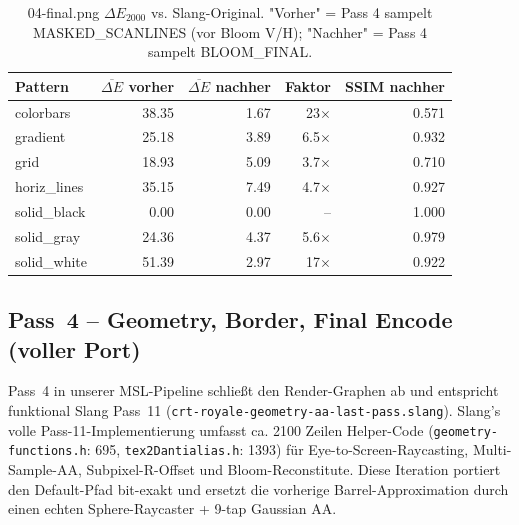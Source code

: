 \documentclass[11pt, a4paper]{article}
\newcommand{\tableheadercolor}{\rowcolor{hkared}}
\newcommand{\thw}[1]{\color{white}\textbf{#1}}  %
\begin{document}
\vspace{.25cm}
\begin{table}[H]
\centering
\small
{}
\begin{tabularx}{\textwidth}{lrrrr}
    \toprule
    \tableheadercolor \thw{Pattern} & \thw{$\overline{\Delta E}$ vorher} & \thw{$\overline{\Delta E}$ nachher} & \thw{Faktor} & \thw{SSIM nachher} \\
    \midrule
    colorbars   & 38.35 & 1.67 & 23$\times$ & 0.571 \\
    gradient    & 25.18 & 3.89 & 6.5$\times$ & 0.932 \\
    grid        & 18.93 & 5.09 & 3.7$\times$ & 0.710 \\
    horiz\_lines & 35.15 & 7.49 & 4.7$\times$ & 0.927 \\
    solid\_black & 0.00 & 0.00 & --       & 1.000 \\
    solid\_gray  & 24.36 & 4.37 & 5.6$\times$ & 0.979 \\
    solid\_white & 51.39 & 2.97 & 17$\times$ & 0.922 \\
    \bottomrule
\end{tabularx}
 \vspace{.25cm}
\caption{04-final.png $\Delta E_{2000}$ vs. Slang-Original. "Vorher" = Pass 4 sampelt MASKED\_SCANLINES (vor Bloom V/H); "Nachher" = Pass 4 sampelt BLOOM\_FINAL.}
\label{tab:dE-final-after-bloom}
\end{table}

\vspace{.5cm}
\subsection{Pass~4 -- Geometry, Border, Final Encode (voller Port)}
\vspace{.5cm}
Pass~4 in unserer MSL-Pipeline schlie{\ss}t den Render-Graphen ab und entspricht funktional Slang Pass~11 (\texttt{crt-royale-geometry-aa-last-pass.slang}). Slang's volle Pass-11-Implementierung umfasst ca. 2100 Zeilen Helper-Code (\texttt{geometry-functions.h}: 695, \texttt{tex2Dantialias.h}: 1393) f\"ur Eye-to-Screen-Raycasting, Multi-Sample-AA, Subpixel-R-Offset und Bloom-Reconstitute. Diese Iteration portiert den Default-Pfad bit-exakt und ersetzt die vorherige Barrel-Approximation durch einen echten Sphere-Raycaster + 9-tap Gaussian AA.
\end{document}
